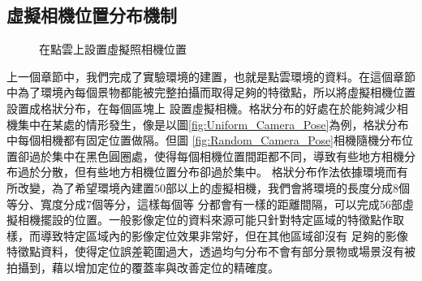 \subsection{虛擬相機位置分布機制}

	\begin{figure}
		\begin{center}
		\end{center}
	  \caption{在點雲上設置虛擬照相機位置}
	  \label{fig:Virtual Camera Pose}	
	\end{figure}	
	
	上一個章節中，我們完成了實驗環境的建置，也就是點雲環境的資料。在這個章節中為了環境內每個景物都能被完整拍攝而取得足夠的特徵點，所以將虛擬相機位置設置成格狀分布，在每個區塊上
	設置虛擬相機。格狀分布的好處在於能夠減少相機集中在某處的情形發生，像是以圖\ref{fig:Uniform_Camera_Pose}為例，格狀分布中每個相機都有固定位置做隔。但圖
	\ref{fig:Random_Camera_Pose}相機隨機分布位置卻過於集中在黑色圓圈處，使得每個相機位置間距都不同，導致有些地方相機分布過於分散，但有些地方相機位置分布卻過於集中。
	格狀分布作法依據環境而有所改變，為了希望環境內建置50部以上的虛擬相機，我們會將環境的長度分成8個等分、寬度分成7個等分，這樣每個等
	分都會有一樣的距離間隔，可以完成56部虛擬相機擺設的位置。一般影像定位的資料來源可能只針對特定區域的特徵點作取樣，而導致特定區域內的影像定位效果非常好，但在其他區域卻沒有
	足夠的影像特徵點資料，使得定位誤差範圍過大，透過均勻分布不會有部分景物或場景沒有被拍攝到，藉以增加定位的覆蓋率與改善定位的精確度。
	

